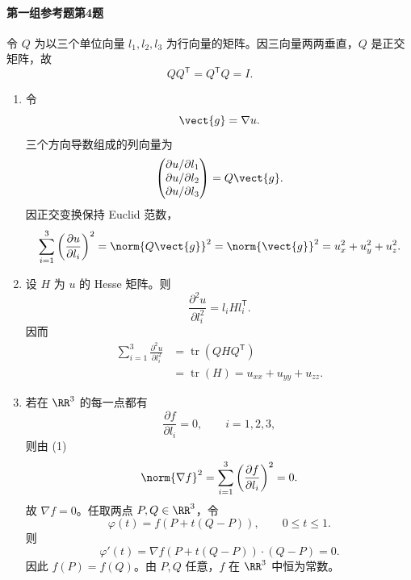 \paragraph{第一组参考题第4题}
\begin{xsolution}
令 $Q$ 为以三个单位向量 $l_1,l_2,l_3$ 为行向量的矩阵。因三向量两两垂直，$Q$ 是正交矩阵，故
\[
  QQ^{\mathsf T}=Q^{\mathsf T}Q=I.
\]

\begin{enumerate}[label=(\arabic*)]
  \item 令
  \[
    \vect{g}=\nabla u.
  \]
  三个方向导数组成的列向量为
  \[
    \begin{pmatrix}
      \partial u/\partial l_1\\
      \partial u/\partial l_2\\
      \partial u/\partial l_3
    \end{pmatrix}
    =Q\vect{g}.
  \]
  因正交变换保持 Euclid 范数，
  \[
    \sum_{i=1}^3\left(\frac{\partial u}{\partial l_i}\right)^2
    =\norm{Q\vect{g}}^2
    =\norm{\vect{g}}^2
    =u_x^2+u_y^2+u_z^2.
  \]

  \item 设 $H$ 为 $u$ 的 Hesse 矩阵。则
  \[
    \frac{\partial^2u}{\partial l_i^2}=l_iH l_i^{\mathsf T}.
  \]
  因而
  \[
  \begin{aligned}
    \sum_{i=1}^3\frac{\partial^2u}{\partial l_i^2}
    &=\operatorname{tr}(QHQ^{\mathsf T})\\
    &=\operatorname{tr}(H)
    =u_{xx}+u_{yy}+u_{zz}.
  \end{aligned}
  \]

  \item 若在 $\RR^3$ 的每一点都有
  \[
    \frac{\partial f}{\partial l_i}=0,
    \qquad i=1,2,3,
  \]
  则由 (1)
  \[
    \norm{\nabla f}^2
    =\sum_{i=1}^3\left(\frac{\partial f}{\partial l_i}\right)^2=0.
  \]
  故 $\nabla f=0$。任取两点 $P,Q\in\RR^3$，令
  \[
    \varphi(t)=f(P+t(Q-P)),\qquad0\le t\le1.
  \]
  则
  \[
    \varphi'(t)=\nabla f(P+t(Q-P))\cdot(Q-P)=0.
  \]
  因此 $f(P)=f(Q)$。由 $P,Q$ 任意，$f$ 在 $\RR^3$ 中恒为常数。
\end{enumerate}
\end{xsolution}

